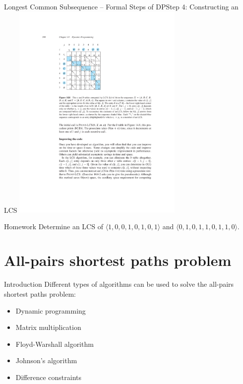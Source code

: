\documentclass[aspectratio=169]{beamer}
\begin{document}
\begin{frame}{Longest Common Subsequence -- Formal Steps of DP}{Step 4: Constructing an LCS}
    \centering
    \includegraphics[width=0.62\textwidth,clip,trim=5.53cm 13cm 3.27cm 4cm]{figures/p398}
\end{frame}

\begin{frame}{Homework}
    \Large
    Determine an LCS of $\langle1, 0, 0, 1, 0, 1, 0, 1\rangle$ and $\langle0, 1, 0, 1, 1, 0, 1, 1, 0\rangle$.
\end{frame}

\section{All-pairs shortest paths problem}

\begin{frame}{Introduction}
    Different types of algorithms can be used to solve the all-pairs shortest paths problem:
    \begin{itemize}
        \item Dynamic programming
        \item Matrix multiplication
        \item Floyd-Warshall algorithm
        \item Johnson’s algorithm
        \item Difference constraints
    \end{itemize}
\end{frame}
\end{document}
